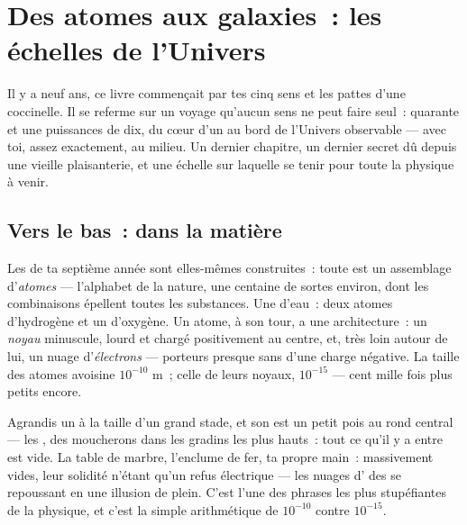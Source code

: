 \chapter{Des atomes aux galaxies~: les échelles de l'Univers}\label{ch:g9:atoms-to-galaxies}

Il y a neuf ans, ce livre commençait par tes cinq sens et les pattes
d'une coccinelle. Il se referme sur un voyage qu'aucun sens ne peut
faire seul~: quarante et une puissances de dix, du cœur d'un  au
bord de l'Univers observable --- avec toi, assez exactement, au
milieu. Un dernier chapitre, un dernier secret dû depuis une vieille
plaisanterie, et une échelle sur laquelle se tenir pour toute la
physique à venir.

\section{Vers le bas~: dans la matière}

\begin{definition}\label{def:g9:atoms-to-galaxies:atom}
Les  de ta septième année sont elles-mêmes construites~:
toute  est un assemblage d'\emph{atomes} ---
l'alphabet de la nature, une centaine de sortes environ, dont les
combinaisons épellent toutes les substances. Une  d'eau~: deux
atomes d'hydrogène et un d'oxygène. Un atome, à son tour, a une
architecture~: un \emph{noyau} minuscule, lourd et chargé
positivement au centre, et, très loin autour de lui, un nuage
d'\emph{électrons} --- porteurs presque sans 
d'une charge négative. La taille des atomes avoisine $10^{-10}$
\unit{m}~; celle de leurs noyaux, $10^{-15}$ --- cent mille fois plus
petits encore.
\end{definition}

\begin{proposition}\label{prop:g9:atoms-to-galaxies:empty}
Agrandis un  à la taille d'un grand stade, et son  est un
petit pois au rond central --- les , des moucherons dans les
gradins les plus hauts~: tout ce qu'il y a entre est vide. La table de
marbre, l'enclume de fer, ta propre main~: massivement vides, leur
solidité n'étant qu'un refus électrique --- les nuages d' des
 se repoussant en une illusion de plein. C'est l'une des phrases
les plus stupéfiantes de la physique, et c'est la simple arithmétique
de $10^{-10}$ contre $10^{-15}$.
\end{proposition}


